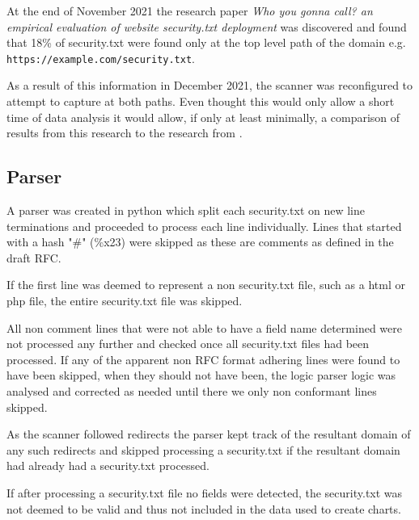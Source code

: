 \documentclass{mscreport}
\begin{document}
\vspace{0.3cm} \noindent
At the end of November 2021 the research paper \textit{Who you gonna call? an empirical evaluation of website security.txt deployment} \cite{Poteat2021-zr} was discovered and found that 18\% of security.txt were found only at the top level path of the domain e.g. \newline \texttt{https://example.com/security.txt}.

\vspace{0.3cm} \noindent
As a result of this information in December 2021, the scanner was reconfigured to attempt to capture at both paths. Even thought this would only allow a short time of data analysis it would allow, if only at least minimally, a comparison of results from this research to the research from \cite{Poteat2021-zr}.

\subsection{Parser}

A parser was created in python which split each security.txt on new line terminations and proceeded to process each line individually. Lines that started with a hash "\#" (\%x23) were skipped as these are comments as defined in the draft RFC.

\vspace{0.3cm} \noindent
If the first line was deemed to represent a non security.txt file, such as a html or php file, the entire security.txt file was skipped.

\vspace{0.3cm} \noindent
All non comment lines that were not able to have a field name determined were not processed any further and checked once all security.txt files had been processed. If any of the apparent non RFC format adhering lines were found to have been skipped, when they should not have been, the logic parser logic was analysed and corrected as needed until there we only non conformant lines skipped.

\vspace{0.3cm} \noindent
As the scanner followed redirects the parser kept track of the resultant domain of any such redirects and skipped processing a security.txt if the resultant domain had already had a security.txt processed.

\vspace{0.3cm} \noindent
If after processing a security.txt file no fields were detected, the security.txt was not deemed to be valid and thus not included in the data used to create charts.
\end{document}

